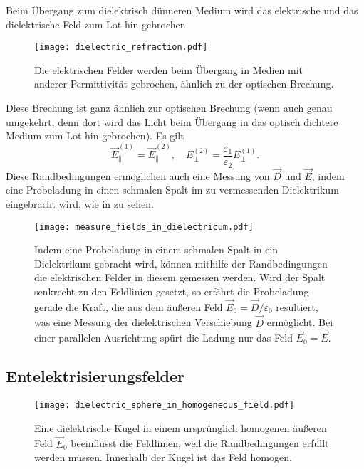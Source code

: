 \begin{formal}
	Beim Übergang zum dielektrisch dünneren Medium wird das elektrische und das dielektrische Feld zum Lot hin gebrochen.
\end{formal}



\begin{figure}[htb]
	\centering
	\texttt{[image: dielectric\_refraction.pdf]}
	\caption{Die elektrischen Felder werden beim Übergang in Medien mit anderer Permittivität gebrochen, ähnlich zu der optischen Brechung. }
	\label{fig:dielectric_refraction}
\end{figure}

Diese Brechung ist ganz ähnlich zur optischen Brechung (wenn auch genau umgekehrt, denn dort wird das Licht beim Übergang in das optisch dichtere Medium zum Lot hin gebrochen). Es gilt
\begin{equation*}
	\vec {E}_{\parallel }^{\left(1\right)}=\vec {E}_{\parallel }^{\left(2\right)},\quad E_{\perp }^{\left(2\right)}=\frac{\varepsilon _{1}}{\varepsilon _{2}}E_{\perp }^{\left(1\right)}.
\end{equation*}
Diese Randbedingungen ermöglichen auch eine Messung von $\vec {D}$ und $\vec {E}$, indem eine Probeladung in einen schmalen Spalt im zu vermessenden Dielektrikum eingebracht wird, wie in  zu sehen.

\begin{figure}[htb]
	\centering
	\texttt{[image: measure\_fields\_in\_dielectricum.pdf]}
	\caption{Indem eine Probeladung in einem schmalen Spalt in ein Dielektrikum gebracht wird, können mithilfe der Randbedingungen die elektrischen Felder in diesem gemessen werden. Wird der Spalt senkrecht zu den Feldlinien gesetzt, so erfährt die Probeladung gerade die Kraft, die aus dem äußeren Feld $\vec E_0=\vec D/\varepsilon_0$ resultiert, was eine Messung der dielektrischen Verschiebung $\vec D$ ermöglicht. Bei einer parallelen Ausrichtung spürt die Ladung nur das Feld $\vec E_0=\vec E$. }
	\label{fig:measure_fields_in_dielectricum}
\end{figure}


\subsection{Entelektrisierungsfelder}




\begin{figure}[htb]
	\centering
	\texttt{[image: dielectric\_sphere\_in\_homogeneous\_field.pdf]}
	\caption{Eine dielektrische Kugel in einem ursprünglich homogenen äußeren Feld $\vec E_0$ beeinflusst die Feldlinien, weil die Randbedingungen erfüllt werden müssen. Innerhalb der Kugel ist das Feld homogen. }
	\label{fig:dielectric_sphere_in_homogeneous_field}
\end{figure}

